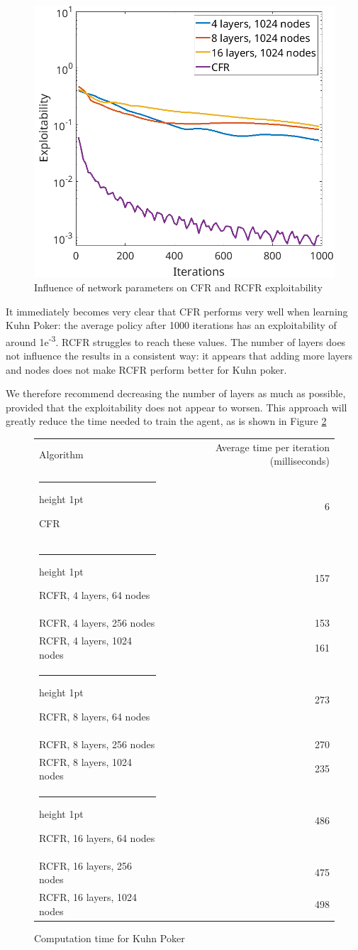 \documentclass[10pt,a4paper]{article}
\makeatletter
\newcommand{\thickhline}{%
    \noalign {\ifnum 0=`}\fi \hrule height 1pt
    \futurelet \reserved@a \@xhline
}
\makeatother
\begin{document}
\begin{figure}[h]
\includegraphics[scale=0.26]{Figures/rcfr_kuhn_parameters3.png}
\caption{Influence of network parameters on CFR and RCFR exploitability}
\label{fig:rcfr_kuhn}
\end{figure}
\FloatBarrier 

It immediately becomes very clear that CFR performs very well when learning Kuhn Poker: the average policy after 1000 iterations has an exploitability of around 1e\textsuperscript{-3}. RCFR struggles to reach these values. The number of layers does not influence the results in a consistent way: it appears that adding more layers and nodes does not make RCFR perform better for Kuhn poker. 

We therefore recommend decreasing the number of layers as much as possible, provided that the exploitability does not appear to worsen. This approach will greatly reduce the time needed to train the agent, as is shown in Figure \ref{tbl:kuhn_times}

\begin{figure}
\centering
\begin{tabular}{|l|r|}
\hline
Algorithm & Average time per iteration (milliseconds)\\
\thickhline
CFR & 6 \\
\thickhline
RCFR, 4 layers, 64 nodes& 157 \\
\hline
RCFR, 4 layers, 256 nodes & 153 \\
\hline
RCFR, 4 layers, 1024 nodes & 161 \\
\thickhline
RCFR, 8 layers, 64 nodes & 273 \\
\hline
RCFR, 8 layers, 256 nodes  & 270 \\
\hline
RCFR, 8 layers, 1024 nodes  & 235 \\
\thickhline
RCFR, 16 layers, 64 nodes & 486 \\
\hline
RCFR, 16 layers, 256 nodes & 475 \\
\hline
RCFR, 16 layers, 1024 nodes & 498 \\
\hline
\end{tabular}
\caption{Computation time for Kuhn Poker}
\label{tbl:kuhn_times}
\end{figure}
\end{document}
